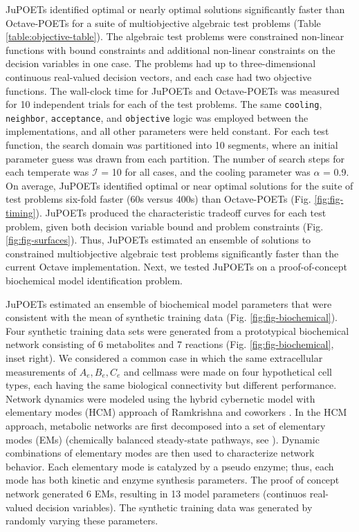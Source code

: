 \documentclass{bmcart}
\begin{document}
JuPOETs identified optimal or nearly optimal solutions significantly faster than Octave-POETs for a suite of multiobjective algebraic test problems (Table \ref{table:objective-table}).
The algebraic test problems were constrained non-linear functions with bound constraints and additional non-linear constraints on the decision variables in one case.
The problems had up to three-dimensional continuous real-valued decision vectors, and each case had two objective functions.
The wall-clock time for JuPOETs and Octave-POETs was measured for 10 independent trials for each of the test problems.
The same \texttt{cooling}, \texttt{neighbor}, \texttt{acceptance}, and \texttt{objective} logic was employed between the implementations, and all other parameters were held constant.
For each test function, the search domain was partitioned into 10 segments, where an initial parameter guess was drawn from each partition.
The number of search steps for each temperate was $\mathcal{I}$ = 10 for all cases, and the cooling parameter was $\alpha$ = 0.9.
On average, JuPOETs identified optimal or near optimal solutions for the suite of test problems six-fold faster (60s versus 400s)
than Octave-POETs (Fig. \ref{fig:fig-timing}). JuPOETs produced the characteristic tradeoff curves for each test problem, given both decision variable bound and
problem constraints (Fig. \ref{fig:fig-surfaces}).
Thus, JuPOETs estimated an ensemble of solutions to constrained multiobjective algebraic test problems significantly faster than the current Octave implementation.
Next, we tested JuPOETs on a proof-of-concept biochemical model identification problem.

JuPOETs estimated an ensemble of biochemical model parameters that were consistent with the mean of synthetic training data (Fig. \ref{fig:fig-biochemical}).
Four synthetic training data sets were generated from a prototypical biochemical network consisting of 6 metabolites and 7 reactions (Fig. \ref{fig:fig-biochemical}, inset right).
We considered a common case in which the same extracellular measurements of $A_{e},B_{e},C_{e}$ and cellmass were made on four hypothetical cell types, each having the same biological connectivity but different performance.
Network dynamics were modeled using the hybrid cybernetic model with elementary modes (HCM) approach of Ramkrishna and coworkers \cite{2008_kim_varner_ramkrishna_BiotechProg}.
In the HCM approach, metabolic networks are first decomposed into a set of elementary modes (EMs) (chemically balanced steady-state pathways, see \cite{Schuster:2000aa}).
Dynamic combinations of elementary modes are then used to characterize network behavior.
Each elementary mode is catalyzed by a pseudo enzyme; thus, each mode has both kinetic and enzyme synthesis parameters.
The proof of concept network generated 6 EMs, resulting in 13 model parameters (continuos real-valued decision variables).
The synthetic training data was generated by randomly varying these parameters.
\end{document}
